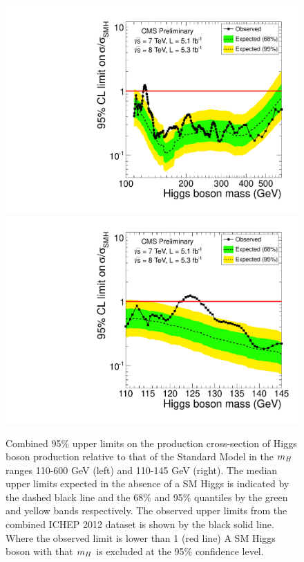 \begin{figure}
\begin{center}
 \includegraphics[width=.49\textwidth]{combinations/ichep2012/Figure_004-a.pdf}
 \includegraphics[width=.49\textwidth]{combinations/ichep2012/Figure_004-b.pdf}
 \caption{Combined 95\% upper limits on the production cross-section of Higgs boson
production relative to that of the Standard Model in the $m_{H}$ ranges 110-600 GeV (left)
and 110-145 GeV (right). The median upper limits expected in the absence of a SM Higgs
is indicated by the dashed black line and the 68\% and 95\% quantiles by the green and yellow
bands respectively.
The observed upper limits from the combined ICHEP 2012 dataset is shown by the black solid line.
Where the observed limit is lower than 1 (red line) A SM Higgs boson with that $m_{H}$ 
is excluded at the 95\% confidence level.}
\label{fig:combinedexcl}
\end{center}
\end{figure}

